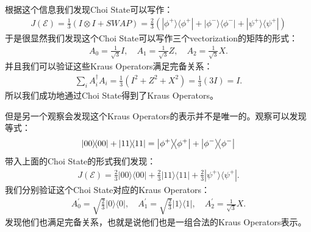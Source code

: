 根据这个信息我们发现Choi State可以写作：
\begin{align}
  J(\mathcal{E})=\frac{1}{3}\left(I\otimes I + SWAP\right) = \frac{2}{3}(|\phi^+\rangle\langle\phi^+|+ |\phi^-\rangle\langle\phi^-| + |\psi^+\rangle\langle\psi^+|)
\end{align}
于是很显然我们发现这个Choi State可以写作三个vectorization的矩阵的形式：
\begin{align}
    A_0=\frac{1}{\sqrt{3}}I,\quad  A_1=\frac{1}{\sqrt{3}}Z,\quad  A_2=\frac{1}{\sqrt{3}}X.
\end{align}
并且我们可以验证这些Kraus Operators满足完备关系：
\begin{align}
  \sum_iA_i^\dagger A_i=\frac{1}{3}{\left(I^2+Z^2+X^2\right)}=\frac{1}{3}(3I)=I.
\end{align}
所以我们成功地通过Choi State得到了Kraus Operators。

\bigskip
{}

但是另一个观察会发现这个Kraus Operators的表示并不是唯一的。观察可以发现等式：
\begin{align}
  \left| 00 \middle\rangle\!\middle\langle 00 \right| + \left| 11 \middle\rangle\!\middle\langle 11 \right| = \left| \phi^+ \middle\rangle\!\middle\langle \phi^+ \right| + \left| \phi^- \middle\rangle\!\middle\langle \phi^- \right|
\end{align}
带入上面的Choi State的形式我们发现：
\begin{align}
J(\mathcal{E})=\frac{2}{3}|00\rangle\langle00|+\frac{2}{3}|11\rangle\langle11|+\frac{2}{3}|\psi^+\rangle\langle\psi^+|.  
\end{align}
我们分别验证这个Choi State对应的Kraus Operators：
\begin{align}
  A_0^{\prime}=\sqrt{\frac{2}{3}}|0\rangle\langle0|,\quad A_1^{\prime}=\sqrt{\frac{2}{3}}|1\rangle\langle1|,\quad A_2^{\prime}=\frac{1}{\sqrt{3}}X. 
\end{align}
发现他们也满足完备关系，也就是说他们也是一组合法的Kraus Operators表示。

\bigskip
{}

